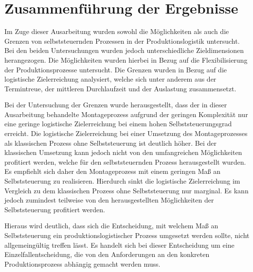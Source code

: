 \section{Zusammenführung der Ergebnisse}
\label{sec:Zusammenfuehrung}

Im Zuge dieser Ausarbeitung wurden sowohl die Möglichkeiten als auch die Grenzen
von selbststeuernden Prozessen in der Produktionslogistik untersucht. Bei den
beiden Untersuchungen wurden jedoch unterschiedliche Zieldimensionen
herangezogen. Die Möglichkeiten wurden hierbei in Bezug auf die Flexibilisierung
der Produktionsprozesse untersucht. Die Grenzen wurden in Bezug auf die
logistische Zielerreichung analysiert, welche sich unter anderem aus der
Termintreue, der mittleren Durchlaufzeit und der Auslastung zusammensetzt.

Bei der Untersuchung der Grenzen wurde herausgestellt, dass der in dieser
Ausarbeitung behandelte Montageprozess aufgrund der geringen Komplexität nur
eine geringe logistische Zielerreichung bei einem hohen Selbststeuerungsgrad
erreicht. Die logistische Zielerreichung bei einer Umsetzung des
Montageprozesses als klassischen Prozess ohne Selbststeuerung ist deutlich
höher. Bei der klassischen Umsetzung kann jedoch nicht von den umfangreichen
Möglichkeiten profitiert werden, welche für den selbststeuernden Prozess
herausgestellt wurden. Es empfiehlt sich daher den Montageprozess mit einem
geringen Maß an Selbststeuerung zu realisieren. Hierdurch sinkt die logistische
Zielerreichung im Vergleich zu dem klassischen Prozess ohne Selbststeuerung nur
marginal. Es kann jedoch zumindest teilweise von den herausgestellten
Möglichkeiten der Selbststeuerung profitiert werden.

Hieraus wird deutlich, dass sich die Entscheidung, mit welchem Maß an
Selbststeuerung ein produktionslogistischer Prozess umgesetzt werden sollte,
nicht allgemeingültig treffen lässt. Es handelt sich bei dieser Entscheidung um
eine Einzelfallentscheidung, die von den Anforderungen an den konkreten
Produktionsprozess abhängig gemacht werden muss.
